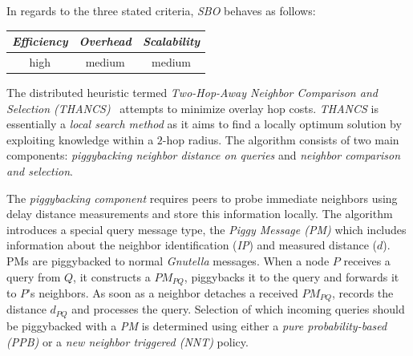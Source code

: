 %
In regards to the three stated criteria, \emph{SBO} behaves as follows:
\begin{center}
{\footnotesize
\begin{tabular}{ccc}
\emph{Efficiency} & \emph{Overhead} & \emph{Scalability} \\
\hline
high &
medium &
%
medium
\end{tabular}
}
\end{center}


The distributed heuristic termed 
\emph{Two-Hop-Away Neighbor Comparison and Selection (THANCS)}~\cite{LNXE2005,L2008}
attempts to minimize overlay hop costs.
\emph{THANCS} is essentially a \emph{local search method} as it aims 
to find a locally optimum solution by exploiting knowledge within 
a $2$-hop radius. The algorithm consists of two main components:
\emph{piggybacking neighbor distance on queries} and
\emph{neighbor comparison and selection}.

The \emph{piggybacking component} requires peers 
to probe immediate neighbors using delay distance measurements 
and store this information locally. 
The algorithm introduces a special query message type, 
the \emph{Piggy Message (PM)} which includes information about 
the neighbor identification (\emph{IP}) and measured distance ($d$). PMs are
piggybacked to normal
{\sl Gnutella} messages. 
When a node $P$ receives a query from $Q$, it constructs a
$PM_{PQ}$, piggybacks it to the query and forwards it to $P$'s neighbors. 
As soon as a neighbor detaches a received $PM_{PQ}$, records the distance 
$d_{PQ}$ and processes the query.
Selection of which incoming queries
should be piggybacked with a \emph{PM} is determined using either a
\emph{pure probability-based (PPB)} or a \emph{new neighbor triggered (NNT)}
policy.


